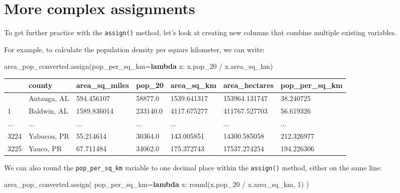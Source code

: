 \documentclass[
  letterpaper,
  DIV=11,
  numbers=noendperiod]{scrreprt}
\newenvironment{Shaded}{\begin{snugshade}}{\end{snugshade}}
\newcommand{\BuiltInTok}[1]{\textcolor[rgb]{0.00,0.23,0.31}{#1}}
\newcommand{\DecValTok}[1]{\textcolor[rgb]{0.68,0.00,0.00}{#1}}
\newcommand{\KeywordTok}[1]{\textcolor[rgb]{0.00,0.23,0.31}{\textbf{#1}}}
\newcommand{\NormalTok}[1]{\textcolor[rgb]{0.00,0.23,0.31}{#1}}
\newcommand{\OperatorTok}[1]{\textcolor[rgb]{0.37,0.37,0.37}{#1}}
\begin{document}
\section{More complex assignments}\label{more-complex-assignments}

To get further practice with the \texttt{assign()} method, let's look at
creating new columns that combine multiple existing variables.

For example, to calculate the population density per square kilometer,
we can write:

\begin{Shaded}
\begin{Highlighting}[]
\NormalTok{area\_pop\_converted.assign(pop\_per\_sq\_km}\OperatorTok{=}\KeywordTok{lambda}\NormalTok{ x: x.pop\_20 }\OperatorTok{/}\NormalTok{ x.area\_sq\_km)}
\end{Highlighting}
\end{Shaded}

\begin{longtable}[]{@{}lllllll@{}}
\toprule\noalign{}
& county & area\_sq\_miles & pop\_20 & area\_sq\_km & area\_hectares &
pop\_per\_sq\_km \\
\midrule\noalign{}
\endhead
\bottomrule\noalign{}
\endlastfoot
0 & Autauga, AL & 594.456107 & 58877.0 & 1539.641317 & 153964.131747 &
38.240725 \\
1 & Baldwin, AL & 1589.836014 & 233140.0 & 4117.675277 & 411767.527703 &
56.619326 \\
... & ... & ... & ... & ... & ... & ... \\
3224 & Yabucoa, PR & 55.214614 & 30364.0 & 143.005851 & 14300.585058 &
212.326977 \\
3225 & Yauco, PR & 67.711484 & 34062.0 & 175.372743 & 17537.274254 &
194.226306 \\
\end{longtable}

We can also round the \texttt{pop\_per\_sq\_km} variable to one decimal
place within the \texttt{assign()} method, either on the same line:

\begin{Shaded}
\begin{Highlighting}[]
\NormalTok{area\_pop\_converted.assign(}
\NormalTok{    pop\_per\_sq\_km}\OperatorTok{=}\KeywordTok{lambda}\NormalTok{ x: }\BuiltInTok{round}\NormalTok{(x.pop\_20 }\OperatorTok{/}\NormalTok{ x.area\_sq\_km, }\DecValTok{1}\NormalTok{)}
\NormalTok{)}
\end{Highlighting}
\end{Shaded}
\end{document}
